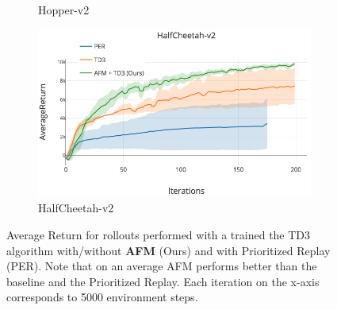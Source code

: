 \begin{figure}[t]
\begin{subfigure}[t]{0.33\textwidth}
    \caption{Hopper-v2}
\end{subfigure}
\begin{subfigure}[t]{0.33\textwidth}
    \includegraphics[scale=0.24]{images/cheetah_td3_final_new.png}
    \caption{HalfCheetah-v2}
\end{subfigure}
\caption{Average Return for rollouts performed with a trained the TD3 algorithm with/without \textbf{AFM} (Ours) and with Prioritized Replay (PER). Note that on an average AFM performs better than the baseline and the Prioritized Replay. Each iteration on the x-axis corresponds to 5000 environment steps.}
\label{fig:td3_results_adv}
\end{figure}

